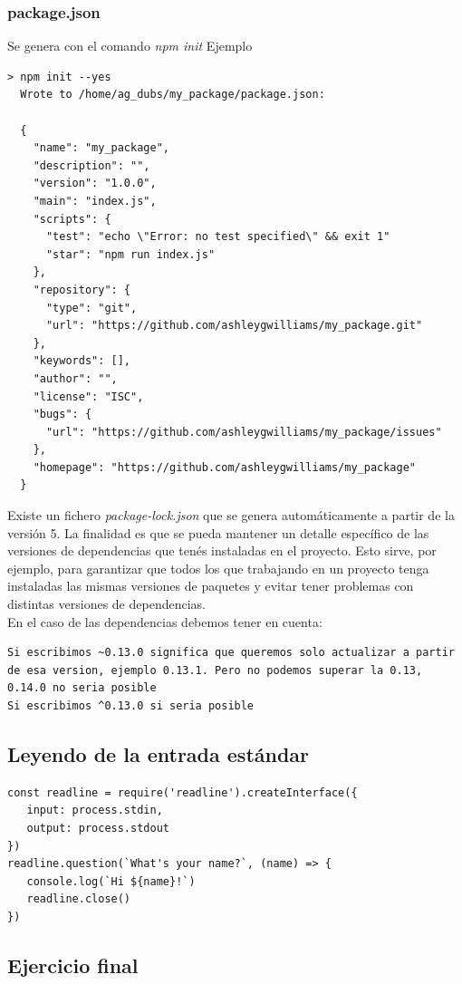 \documentclass[4paper]{article}
\begin{document}
 \newpage
\subsubsection{package.json}
Se genera con el comando \emph{npm init}
Ejemplo
\begin{lstlisting}
> npm init --yes
  Wrote to /home/ag_dubs/my_package/package.json:

  {
    "name": "my_package",
    "description": "",
    "version": "1.0.0",
    "main": "index.js",
    "scripts": {
      "test": "echo \"Error: no test specified\" && exit 1"
      "star": "npm run index.js"
    },
    "repository": {
      "type": "git",
      "url": "https://github.com/ashleygwilliams/my_package.git"
    },
    "keywords": [],
    "author": "",
    "license": "ISC",
    "bugs": {
      "url": "https://github.com/ashleygwilliams/my_package/issues"
    },
    "homepage": "https://github.com/ashleygwilliams/my_package"
  }
\end{lstlisting}
Existe un fichero \emph{package-lock.json} que se genera automáticamente a partir de la versión 5. La finalidad es que se pueda mantener un detalle específico de las versiones de dependencias que tenés instaladas en el proyecto. Esto sirve, por ejemplo, para garantizar que todos los que trabajando en un proyecto tenga instaladas las mismas versiones de paquetes y evitar tener problemas con distintas versiones de dependencias.\\
En el caso de las dependencias debemos tener en cuenta:
\begin{lstlisting}
Si escribimos ~0.13.0 significa que queremos solo actualizar a partir de esa version, ejemplo 0.13.1. Pero no podemos superar la 0.13, 0.14.0 no seria posible
Si escribimos ^0.13.0 si seria posible
\end{lstlisting}
\subsection{Leyendo de la entrada estándar}
\begin{lstlisting}
const readline = require('readline').createInterface({
   input: process.stdin,
   output: process.stdout
})
readline.question(`What's your name?`, (name) => {
   console.log(`Hi ${name}!`)
   readline.close()
})
\end{lstlisting}

\subsection{Ejercicio final}
\end{document}
